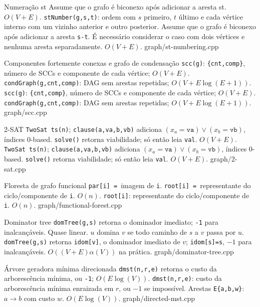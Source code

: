 \templateentry
{Numeração st}
{Assume que o grafo é biconexo após adicionar a aresta st. $O(V + E)$.}
{\texttt{stNumber(g,s,t)}: ordem com $s$ primeiro, $t$ último e cada vértice interno com um vizinho anterior e outro posterior. Assume que o grafo é biconexo após adicionar a aresta \texttt{s-t}. É necessário considerar o caso com dois vértices e nenhuma aresta separadamente. $O(V + E)$.}
{graph/st-numbering.cpp}

\templateentry
{Componentes fortemente conexas e grafo de condensação}
{\texttt{scc(g)}: \texttt{\{cnt,comp\}}, número de SCCs e componente de cada vértice; $O(V+E)$. \texttt{condGraph(g,cnt,comp)}: DAG sem arestas repetidas; $O(V+E\log(E+1))$.}
{\texttt{scc(g)}: \texttt{\{cnt,comp\}}, número de SCCs e componente de cada vértice; $O(V+E)$. \texttt{condGraph(g,cnt,comp)}: DAG sem arestas repetidas; $O(V+E\log(E+1))$.}
{graph/scc.cpp}

\templateentry
{2-SAT}
{\texttt{TwoSat ts(n)}; \texttt{clause(a,va,b,vb)} adiciona $(x_a=\mathtt{va})\lor(x_b=\mathtt{vb})$, índices 0-based. \texttt{solve()} retorna viabilidade; só então leia \texttt{val}. $O(V+E)$.}
{\texttt{TwoSat ts(n)}; \texttt{clause(a,va,b,vb)} adiciona $(x_a=\mathtt{va})\lor(x_b=\mathtt{vb})$, índices 0-based. \texttt{solve()} retorna viabilidade; só então leia \texttt{val}. $O(V+E)$.}
{graph/2-sat.cpp}

\ifextended

\templateentry
{Floresta de grafo funcional}
{\texttt{par[i] = }imagem de \texttt{i}. \texttt{root[i] = }representante do ciclo/componente de \texttt{i}. $O(n)$.}
{\texttt{root[i]}: representante do ciclo/componente de \texttt{i}. $O(n)$.}
{graph/functional-forest.cpp}

\fi

\templateentry
{Dominator tree}
{\texttt{domTree(g,s)} retorna o dominador imediato; \texttt{-1} para inalcançáveis. Quase linear.}
{$u$ domina $v$ se todo caminho de $s$ a $v$ passa por $u$. \texttt{domTree(g,s)} retorna \texttt{idom[v]}, o dominador imediato de $v$; \texttt{idom[s]=s}, $-1$ para inalcançáveis. $O((V + E)\alpha(V))$ na prática.}
{graph/dominator-tree.cpp}

\templateentry
{Árvore geradora mínima direcionada}
{\texttt{dmst(n,r,e)} retorna o custo da arborescência mínima, ou \texttt{-1}; $O(E \log(V))$.}
{\texttt{dmst(n,r,e)}: custo da arborescência mínima enraizada em $r$, ou $-1$ se impossível. Arestas \texttt{E\{a,b,w\}}: $a\to b$ com custo $w$. $O(E \log(V))$.}
{graph/directed-mst.cpp}

